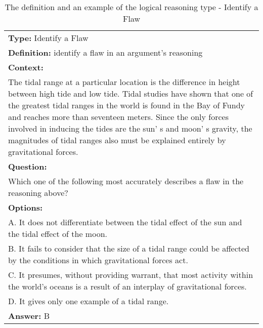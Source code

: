 \documentclass{article} \usepackage{iclr2020_conference,times}
\begin{document}
\begin{table}
	\small
	\centering
	\caption{The definition and an example of the logical reasoning type - Identify a Flaw}
	\begin{tabular}{|p{}|}
		\hline
		{\bf Type: }Identify a Flaw \\
		
		{\bf Definition: }identify a flaw in an argument's reasoning
		\\
		\hline
		{\bf Context:} \\The tidal range at a particular location is the difference in height between high tide and low tide. Tidal studies have shown that one of the greatest tidal ranges in the world is found in the Bay of Fundy and reaches more than seventeen meters. Since the only forces involved in inducing the tides are the sun' s and moon' s gravity, the magnitudes of tidal ranges also must be explained entirely by gravitational forces.
		\\
		{\bf Question:}\\Which one of the following most accurately describes a flaw in the reasoning above?\\
		{\bf Options:}\\
			A. It does not differentiate between the tidal effect of the sun and the tidal effect of the moon.\\
			B. It fails to consider that the size of a tidal range could be affected by the conditions in which gravitational forces act.\\
			C. It presumes, without providing warrant, that most activity within the world's oceans is a result of an interplay of gravitational forces.\\
			D. It gives only one example of a tidal range.\\
		{\bf Answer: }B \\
		\hline
	\end{tabular}
	\label{tab:identify-a-flaw}
\end{table}
\end{document}
